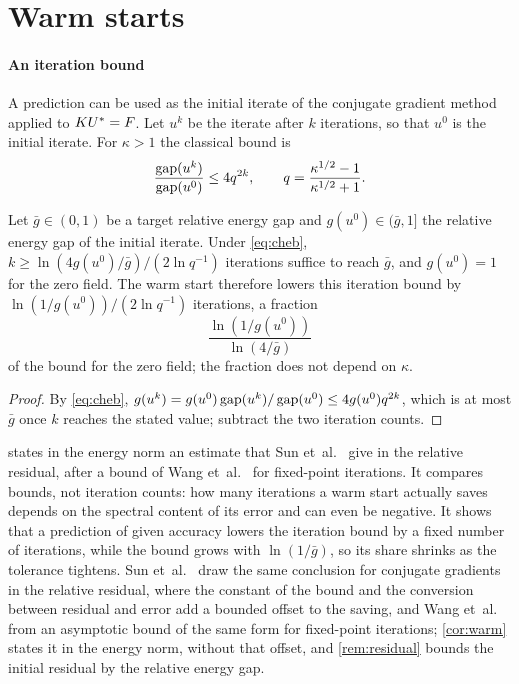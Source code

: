 \section{Warm starts}\label{supp:warm}

\paragraph{An iteration bound}
A prediction can be used as the initial iterate of the conjugate gradient method
\cite{HestenesStiefel1952} applied to $KU^{\ast}=F$. Let $u^k$ be the iterate after $k$
iterations, so that $u^0$ is the initial iterate. For $\kappa>1$ the classical bound \cite[Section~6.11.3]{Saad2003} is
\begin{equation}
\frac{\operatorname{gap}(u^k)}{\operatorname{gap}(u^0)} \le 4q^{2k},
\qquad
q = \frac{\kappa^{1/2}-1}{\kappa^{1/2}+1}.
\label{eq:cheb}
\end{equation}

\begin{corollary}\label{cor:warm}
Let $\bar g\in(0,1)$ be a target relative energy gap and $g(u^0)\in(\bar g,1]$ the
relative energy gap of the initial iterate. Under \eqref{eq:cheb},
$k\ge\ln(4g(u^0)/\bar g)/(2\ln q^{-1})$ iterations suffice to reach $\bar g$, and
$g(u^0)=1$ for the zero field. The warm start therefore lowers this iteration bound by
$\ln(1/g(u^0))/(2\ln q^{-1})$ iterations, a fraction
\begin{equation}
\frac{\ln(1/g(u^0))}{\ln(4/\bar g)}
\label{eq:warm}
\end{equation}
of the bound for the zero field; the fraction does not depend on $\kappa$.
\end{corollary}

\begin{proof}
By \eqref{eq:cheb}, $g(u^k)=g(u^0)\operatorname{gap}(u^k)/\operatorname{gap}(u^0)\le4g(u^0)q^{2k}$, which is at most $\bar g$ once
$k$ reaches the stated value; subtract the two iteration counts.
\end{proof}

 states in the energy norm an estimate that Sun et~al.~\cite{Sun2026FEVessel}
give in the relative residual, after a bound of Wang et~al.~\cite{Wang2026PretrainFEM} for
fixed-point iterations. It compares bounds, not iteration counts: how many iterations a warm
start actually saves depends on the spectral content of its error and can even be negative. It shows that a prediction of given accuracy lowers the iteration bound by a fixed
number of iterations, while the bound grows with $\ln(1/\bar g)$, so its share shrinks
as the tolerance tightens. Sun et~al.~\cite{Sun2026FEVessel} draw the same conclusion for
conjugate gradients in the relative residual, where the constant of the bound and the
conversion between residual and error add a bounded offset to the saving, and Wang
et~al.~\cite{Wang2026PretrainFEM} from an asymptotic bound of the same form for fixed-point
iterations; \cref{cor:warm} states it in the energy norm, without that offset, and
\cref{rem:residual} bounds the initial residual by the relative energy gap.

